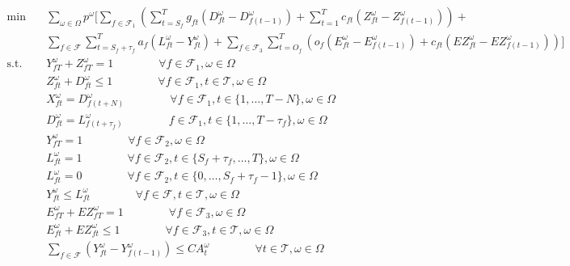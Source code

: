 \documentclass[12pt]{article}
\begin{document}
	\begin{subequations}
		\begin{align}
			\min \quad & \sum_{\omega \in \Omega} p^\omega \bigg[ \sum_{f \in \mathcal{F}_1} \left(\sum_{t = S_f}^T g_{ft}(D_{ft}^\omega - D_{f(t-1)}^\omega) + \sum_{t = 1}^T c_{ft}(Z_{ft}^\omega - Z_{f(t-1)}^\omega) \right) + \nonumber\\
			& \sum_{f \in \mathcal{F}}\sum_{t = S_f+\tau_f}^T a_{f}(L_{ft}^\omega - Y_{ft}^\omega) + \sum_{f \in \mathcal{F}_3} \sum_{t = O_f}^{T} \left(o_{f}(E_{ft}^\omega - E_{f(t-1)}^\omega) + c_{ft}(EZ_{ft}^\omega - EZ_{f(t-1)}^\omega)\right) \bigg]\\
			\text{s.t.} \quad &  Y_{fT}^\omega + Z_{fT}^\omega = 1 \qquad \qquad \forall f \in \mathcal{F}_1, \omega \in \Omega \label{cons:cancelORfly}\\
			& Z_{ft}^\omega + D_{ft}^\omega \leq 1 \qquad \qquad \forall f \in \mathcal{F}_1, t \in \mathcal{T}, \omega \in \Omega \label{cons:cancelORplan}\\
			& X_{ft}^\omega = D_{f(t+N)}^\omega \qquad \qquad \forall f \in \mathcal{F}_1, t \in \{1, \dots, T-N\}, \omega \in \Omega \label{cons:planahead}\\
			& D_{ft}^\omega = L_{f(t + \tau_f)}^\omega \qquad \qquad f \in \mathcal{F}_1, t \in \{1, \dots, T - \tau_{f}\}, \omega \in \Omega \label{cons:depLag}\\
			& Y_{fT}^\omega = 1 \qquad \qquad \forall f \in \mathcal{F}_2, \omega \in \Omega \label{cons:mustLand}\\
			& L_{ft}^\omega = 1 \qquad \qquad \forall f \in \mathcal{F}_2, t \in \{S_f+\tau_f, \dots, T\}, \omega \in \Omega \label{cons:mustArr}\\
			& L_{ft}^\omega = 0 \qquad \qquad \forall f \in \mathcal{F}_2, t \in \{0, \dots, S_f+\tau_f-1\}, \omega \in \Omega \label{cons:cannotArr}\\
			& Y_{ft}^\omega \leq L_{ft}^\omega \qquad \qquad \forall f \in \mathcal{F}, t \in \mathcal{T}, \omega \in \Omega \label{cons:arrland}\\
			& E_{fT}^\omega + EZ_{fT}^\omega = 1 \qquad \qquad \forall f \in \mathcal{F}_3, \omega \in \Omega \label{cons:cancelORto}\\
			& E_{ft}^\omega + EZ_{ft}^\omega \leq 1 \qquad \qquad \forall f \in \mathcal{F}_3, t \in \mathcal{T}, \omega \in \Omega \label{cons:cancelTO2}\\
			& \sum_{f \in \mathcal{F}}\left(Y_{ft}^\omega - Y_{f(t-1)}^\omega\right) \leq CA_{t}^\omega \qquad \qquad \forall t \in \mathcal{T}, \omega \in \Omega \label{cons:arrCap}\\

\end{align}
\end{subequations}
\end{document}

